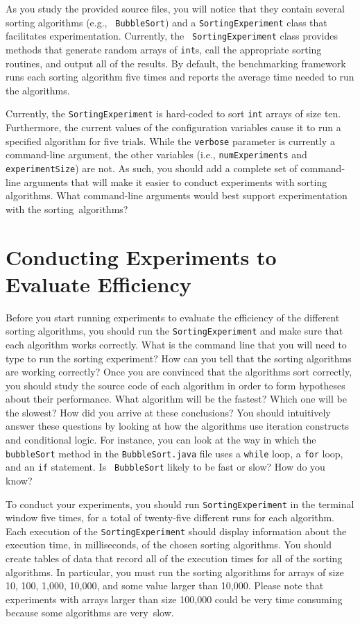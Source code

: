 As you study the provided source files, you will notice that they contain several sorting algorithms (e.g., {\tt
  BubbleSort}) and a {\tt SortingExperiment} class that facilitates experimentation. Currently, the {\tt
  SortingExperiment} class provides methods that generate random arrays of {\tt int}s, call the appropriate sorting
routines, and output all of the results.  By default, the benchmarking framework runs each sorting algorithm five times
and reports the average time needed to run the algorithms.

Currently, the {\tt SortingExperiment} is hard-coded to sort {\tt int} arrays of size ten. Furthermore, the current
values of the configuration variables cause it to run a specified algorithm for five trials.  While the {\tt verbose}
parameter is currently a command-line argument, the other variables (i.e., {\tt numExperiments} and {\tt
  experimentSize}) are not.  As such, you should add a complete set of command-line arguments that will make it easier
to conduct experiments with sorting algorithms. What command-line arguments would best support experimentation with
the \mbox{sorting algorithms}?

\section*{Conducting Experiments to Evaluate Efficiency}

Before you start running experiments to evaluate the efficiency of the different sorting algorithms, you should run the
{\tt SortingExperiment} and make sure that each algorithm works correctly.  What is the command line that you will need
to type to run the sorting experiment? How can you tell that the sorting algorithms are working correctly? Once you are
convinced that the algorithms sort correctly, you should study the source code of each algorithm in order to form
hypotheses about their performance.  What algorithm will be the fastest? Which one will be the slowest? How did you
arrive at these conclusions? You should intuitively answer these questions by looking at how the algorithms use
iteration constructs and conditional logic. For instance, you can look at the way in which the {\tt bubbleSort} method
in the {\tt BubbleSort.java} file uses a {\tt while} loop, a {\tt for} loop, and an {\tt if} statement. Is {\tt
BubbleSort} likely to be fast or slow? How do you know?

To conduct your experiments, you should run {\tt SortingExperiment} in the terminal window five times, for a total of
twenty-five different runs for each algorithm. Each execution of the {\tt SortingExperiment} should display information
about the execution time, in milliseconds, of the chosen sorting algorithms. You should create tables of data that
record all of the execution times for all of the sorting algorithms. In particular, you must run the sorting algorithms
for arrays of size 10, 100, 1,000, 10,000, and some value larger than 10,000. Please note that experiments
with arrays larger than size 100,000 could be very time consuming because some algorithms are \mbox{very slow}.

